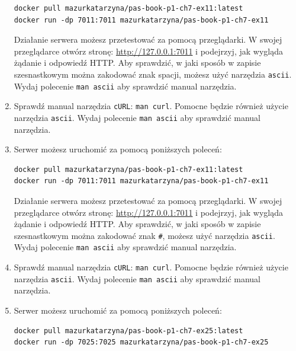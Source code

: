 \begin{enumerate}[label=\textbf{7.\arabic*}]
\begin{verbatim}
docker pull mazurkatarzyna/pas-book-p1-ch7-ex11:latest
docker run -dp 7011:7011 mazurkatarzyna/pas-book-p1-ch7-ex11
\end{verbatim}

\noindent Działanie serwera możesz przetestować za pomocą przeglądarki. W swojej przeglądarce otwórz stronę: \url{http://127.0.0.1:7011} i podejrzyj, jak wygląda żądanie i odpowiedź HTTP. Aby sprawdzić,  w jaki sposób w zapisie szesnastkowym można zakodować znak spacji, możesz użyć narzędzia \texttt{ascii}. Wydaj polecenie \texttt{man ascii} aby sprawdzić manual narzędzia.
\item Sprawdź manual narzędzia \texttt{cURL}: \texttt{man curl}. Pomocne będzie również użycie narzędzia \texttt{ascii}. Wydaj polecenie \texttt{man ascii} aby sprawdzić manual narzędzia.

\item Serwer możesz uruchomić za pomocą poniższych poleceń:

\begin{verbatim}
docker pull mazurkatarzyna/pas-book-p1-ch7-ex11:latest
docker run -dp 7011:7011 mazurkatarzyna/pas-book-p1-ch7-ex11
\end{verbatim}

\noindent Działanie serwera możesz przetestować za pomocą przeglądarki. W swojej przeglądarce otwórz stronę: \url{http://127.0.0.1:7011} i podejrzyj, jak wygląda żądanie i odpowiedź HTTP. Aby sprawdzić,  w jaki sposób w zapisie szesnastkowym można zakodować znak \texttt{\#}, możesz użyć narzędzia \texttt{ascii}. Wydaj polecenie \texttt{man ascii} aby sprawdzić manual narzędzia.
\item Sprawdź manual narzędzia \texttt{cURL}: \texttt{man curl}. Pomocne będzie również użycie narzędzia \texttt{ascii}. Wydaj polecenie \texttt{man ascii} aby sprawdzić manual narzędzia.
\item  Serwer możesz uruchomić za pomocą poniższych poleceń:

\begin{verbatim}
docker pull mazurkatarzyna/pas-book-p1-ch7-ex25:latest
docker run -dp 7025:7025 mazurkatarzyna/pas-book-p1-ch7-ex25
\end{verbatim}


\end{enumerate}
